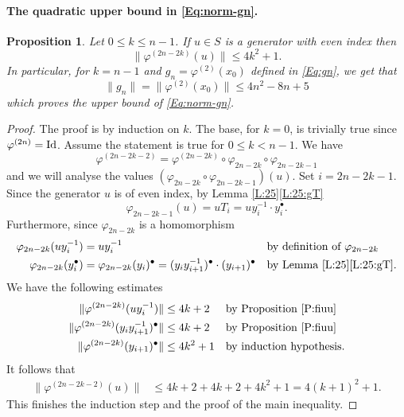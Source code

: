 \documentclass[12pt,reqno,a4paper]{article}
\newtheorem{proposition}[theorem]{Proposition}
\theoremstyle{definition}
\theoremstyle{remark}
\numberwithin{equation}{section}
\numberwithin{figure}{section}
\begin{document}
\paragraph{The quadratic upper bound in \eqref{Eq:norm-gn}.}

\begin{proposition}\label{P:fiu}
Let $0\leq k\leq n-1$. If $u\in S$ is a generator with even index
then
\begin{equation}
\|\varphi^{(2n-2k)}(u)\| \leq 4k^2+1.
\label{Eq:fiu}
\end{equation}
In particular, for $k=n-1$ and $g_n=\varphi^{(2)}(x_0)$ defined in \eqref{Eq:gn}, we get that
\[
\|g_n\|=\|\varphi^{(2)}(x_0)\|\leq 4n^2-8n+5
\]
which  proves the upper bound of \eqref{Eq:norm-gn}.
\end{proposition}
\begin{proof}
The proof is by induction on $k$. The base, for $k=0$, is trivially true
since $\varphi^{(2n)}={\rm Id}$. Assume the statement is true for $0\leq k <n-1$.
We have 
$$
\varphi^{(2n-2k-2)} = \varphi^{(2n-2k)}\circ \varphi_{2n-2k}\circ \varphi_{2n-2k-1}
$$
and we will analyse the values $(\varphi_{2n-2k}\circ \varphi_{2n-2k-1})(u)$.
Set $i=2n-2k-1$. 
Since the generator $u$ is of even index, by Lemma \ref{L:25}\ref{L:25:gT}
$$
\varphi_{2n-2k-1}(u) = uT_i = uy_i^{-1}\cdot y_i^{\bullet}.
$$
Furthermore, since $\varphi_{2n-2k}$ is a homomorphism
\begin{align*}
\varphi_{2n-2k}(uy_i^{-1}) &= uy_i^{-1} & & \text{by definition of $\varphi_{2n-2k}$} \\
\varphi_{2n-2k}(y_i^{\bullet}) &= \varphi_{2n-2k}(y_i)^{\bullet} = (y_iy_{i+1}^{-1})^{\bullet} \cdot (y_{i+1})^{\bullet} & & \text{by  Lemma \ref{L:25}\ref{L:25:gT}.}
\end{align*}
We have the following estimates
\begin{align*}
\|\varphi^{(2n-2k)}(uy_i^{-1})\| &\leq 4k+2 &&\text{by Proposition \ref{P:fiuu}}\\
\|\varphi^{(2n-2k)}(y_iy_{i+1}^{-1})^{\bullet}\| &\leq 4k+2 &&\text{by Proposition \ref{P:fiuu}}\\
\|\varphi^{(2n-2k)}(y_{i+1})^{\bullet}\| &\leq 4k^2+1 &&\text{by induction hypothesis}.
\end{align*}
It follows that
\begin{align*}
\|\varphi^{(2n-2k-2)}(u)\|
&\leq 4k+2 + 4k+2 + 4k^2+1 = 4(k+1)^2+1.
\end{align*}
This finishes the induction step and the proof of the main inequality.
\end{proof}
\end{document}
